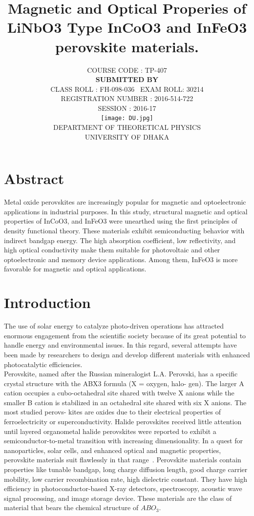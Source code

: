 \documentclass[12pt, letterpaper]{article}
\title{\color{blue}Magnetic and Optical Properies of  LiNbO3 Type InCoO3 and InFeO3 perovskite materials.}
\author{ COURSE CODE : TP-407 \\ \textbf{SUBMITTED BY}
 \\  CLASS ROLL : FH-098-036 \  EXAM ROLL: 30214 \\
 REGISTRATION NUMBER : 2016-514-722 \\     SESSION : 2016-17
\\ 
\texttt{[image: DU.jpg]} \\  DEPARTMENT OF THEORETICAL PHYSICS \\ UNIVERSITY OF DHAKA 
}
\newcommand*{\1}{\hspace{1pt}}
\begin{document}
    \maketitle
    \newpage
    \tableofcontents
    \newpage
    \listoffigures
    
    \newpage
    \section{Abstract}
    Metal oxide perovskites are increasingly popular for magnetic and optoelectronic applications in industrial purposes. In this study, structural magnetic and 
    optical properties of InCoO3, and InFeO3 were unearthed using the first principles of density functional theory. These materials exhibit semiconducting behavior 
    with indirect bandgap energy. The high absorption coefficient, low reflectivity, and high optical conductivity make them suitable for photovoltaic and other 
    optoelectronic and memory device applications. Among them, InFeO3 is more favorable for magnetic and optical applications.
     
    \section{Introduction}
    The use of solar energy to catalyze photo-driven operations has 
    attracted enormous engagement from the scientific society because of 
    its great potential to handle energy and environmental issues. In this 
    regard, several attempts have been made by researchers to design and 
    develop different materials with enhanced photocatalytic efficiencies.\cite{r1}\\
    Perovskite, named after the Russian mineralogist L.A. Perovski, has a
    specific crystal structure with the ABX3 formula (X = oxygen, halo-
    gen). The larger A cation occupies a cubo-octahedral site shared with
    twelve X anions while the smaller B cation is stabilized in an
    octahedral site shared with six X anions. The most studied perovs-
    kites are oxides due to their electrical properties of ferroelectricity or
    superconductivity. Halide perovskites received little attention until
    layered organometal halide perovskites were reported to exhibit a
    semiconductor-to-metal transition with increasing dimensionality.
    In a quest for nanoparticles, solar cells, and enhanced optical and magnetic properties, perovskite materials suit flawlessly in that range~\cite{r1}. Perovskite materials 
    contain properties like tunable bandgap, long charge diffusion length, good charge carrier mobility, low carrier recombination rate, high dielectric constant. 
    They have high efficiency in photoconductor-based X-ray detectors, spectroscopy, acoustic wave signal processing, and image storage device. These materials are 
    the class of material that bears the chemical structure of $ABO_{3}$\cite{r2,r13,r14}.
    
\end{document}
